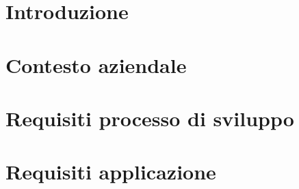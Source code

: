 
\section{Introduzione}

\section{Contesto aziendale}

\section{Requisiti processo di sviluppo}

\section{Requisiti applicazione}
